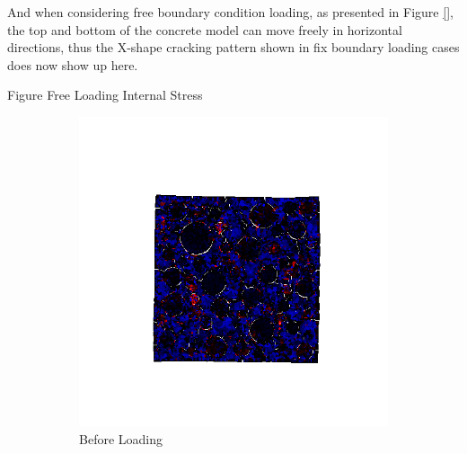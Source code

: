 And when considering free boundary condition loading, as presented in Figure \ref{}, the top and bottom of the concrete model can move freely in horizontal directions, thus the X-shape cracking pattern shown in fix boundary loading cases does now show up here.


Figure Free Loading Internal Stress


\begin{figure}[ht]
\centering

    \begin{subfigure}{.33\textwidth}
      \centering
      \includegraphics[width=1.0\linewidth]{Files/A30P75_3_IS/DEP50-STEP(020).png}
      \caption{Before Loading}
    \end{subfigure}%
    \begin{subfigure}{.33\textwidth}
      \centering

\end{subfigure}
\end{figure}
